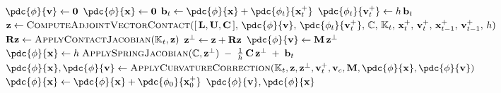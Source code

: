 \begin{algorithm}[H]
\caption{Full backward pass through PD simulation with contact.}
\label{alg:PD_contact_backward_full}
\begin{algorithmic}[1]
\addtolength{\itemsep}{0.5ex}
    \State $\pdc{\phi}{\vv} \gets \zero$
    \State $\pdc{\phi}{\x} \gets \zero$
        \State $\bb_t \gets \pdc{\phi}{\x} + \pdc{\phi_t}{\x^+_t}$
        \State $\pdc{\phi_t}{\vv^+_t} \gets h\,\bb_t$
        \State $\z \gets \textsc{ComputeAdjointVectorContact}([\,\LL,\mathbf{U}, \C\,],\, \pdc{\phi}{\vv},\, \pdc{\phi_t}{\vv^+_t},\, \mathbb{C},\, \mathbb{K}_t,\, \x^+_t,\, \vv^+_t,\, \x^+_{t-1},\, \vv^+_{t-1},\, h)$
        \State $\mathbf{R}\mathbf{z} \gets \textsc{ApplyContactJacobian}(\mathbb{K}_t, \mathbf{z})$
        \State $\mathbf{z}^{\perp} \gets \mathbf{z} + \mathbf{R}\mathbf{z}$
        \State $\pdc{\phi}{\vv} \gets \M\,\z^{\perp}$
        \State $\pdc{\phi}{\x} \gets h\;\textsc{ApplySpringJacobian}(\mathbb{C}, \z^{\perp}) \;-\; \tfrac{1}{h}\,\C\,\z^{\perp} \;+\; \bb_t$
        \State $\pdc{\phi}{\x}, \pdc{\phi}{\vv} \gets \textsc{ApplyCurvatureCorrection}(\mathbb{K}_t, \z, \z^{\perp}, \vv^+_t, \vv_c, \M, \pdc{\phi}{\x}, \pdc{\phi}{\vv})$
    \EndFor
    \State $\pdc{\phi}{\x} \gets \pdc{\phi}{\x} + \pdc{\phi_0}{\x^+_0}$
    \State \Return $\pdc{\phi}{\vv}, \pdc{\phi}{\x}$
\EndFunction
\end{algorithmic}
\end{algorithm}


